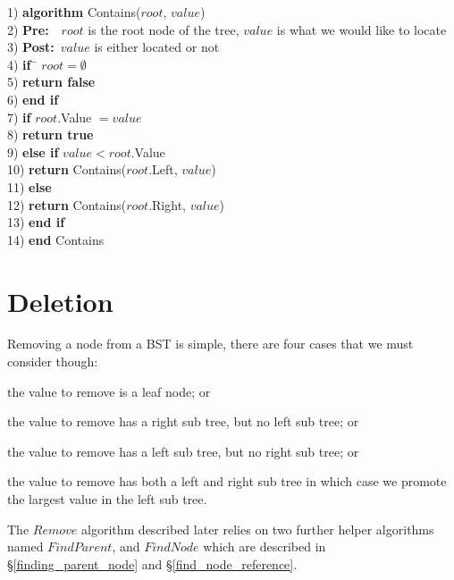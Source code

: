 \begin{tabbing}
1)  \textbf{alg}\= \textbf{orithm} Contains($root$, $value$) \\
2)  \> \textbf{Pre:}~~$root$ is the root node of the tree, $value$ is what we would like to locate \\
3)  \> \textbf{Post:}~$value$ is either located or not \\
4)  \> \textbf{if}~\= $root = \emptyset$ \\
5)  \> \> \textbf{return false} \\
6)  \> \textbf{end if} \\
7)  \> \textbf{if} $root$.Value $= value$ \\
8)  \> \> \textbf{return true} \\
9)  \> \textbf{else if} $value < root$.Value \\
10) \> \> \textbf{return} Contains($root$.Left, $value$) \\
11) \> \textbf{else} \\
12) \> \> \textbf{return} Contains($root$.Right, $value$) \\
13) \> \textbf{end if} \\
14) \textbf{end} Contains \\
\end{tabbing}

\section{Deletion}
Removing a node from a BST is simple, there are four cases that we must consider though: 
\begin{inparaenum}
\item the value to remove is a leaf node; or
\item the value to remove has a right sub tree, but no left sub tree; or
\item the value to remove has a left sub tree, but no right sub tree; or
\item the value to remove has both a left and right sub tree in which case we promote the largest value in the left sub tree.
\end{inparaenum}
The $Remove$ algorithm described later relies on two further helper algorithms named $FindParent$, and $FindNode$ which are described in \S\ref{finding_parent_node} and \S\ref{find_node_reference}.

